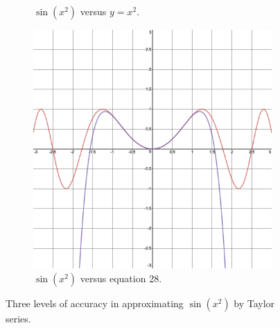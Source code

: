\documentclass{article}
\begin{document}
\begin{figure}[h!]
\begin{subfigure}[b]{0.3\linewidth}
        \caption{$\sin(x^2)$ versus $y=x^2$.}
        \label{fig:6b}
    \end{subfigure}\hspace{1.5em}
    \begin{subfigure}[b]{0.3\linewidth}
        \includegraphics[width=\linewidth]{Blender/y-28.png}
        \caption{$\sin(x^2)$ versus equation 28.}
        \label{fig:6c}
    \end{subfigure}
    \caption{Three levels of accuracy in approximating $\sin(x^2)$ by Taylor series.}
    \label{fig:6}
\end{figure}
\end{document}
